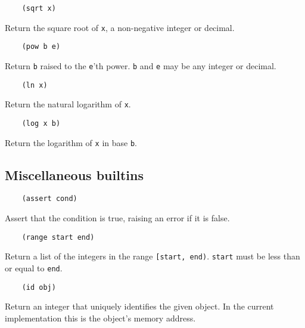 \documentclass{article}
\newcommand{\inlinecode}{\texttt}
\begin{document}
\begin{verbatim}
    (sqrt x)
\end{verbatim}

Return the square root of \inlinecode{x}, a non-negative integer or decimal.

\begin{verbatim}
    (pow b e)
\end{verbatim}

Return \inlinecode{b} raised to the \inlinecode{e}'th power. \inlinecode{b} and \inlinecode{e} may be any integer or decimal.

\begin{verbatim}
    (ln x)
\end{verbatim}

Return the natural logarithm of \inlinecode{x}.

\begin{verbatim}
    (log x b)
\end{verbatim}

Return the logarithm of \inlinecode{x} in base \inlinecode{b}.

\subsection{Miscellaneous builtins}
\begin{verbatim}
    (assert cond)
\end{verbatim}

Assert that the condition is true, raising an error if it is false.

\begin{verbatim}
    (range start end)
\end{verbatim}

Return a list of the integers in the range \inlinecode{[start, end)}. \inlinecode{start} must be less than or equal to \inlinecode{end}.

\begin{verbatim}
    (id obj)
\end{verbatim}

Return an integer that uniquely identifies the given object. In the current implementation this is the object's memory address.
\end{document}
